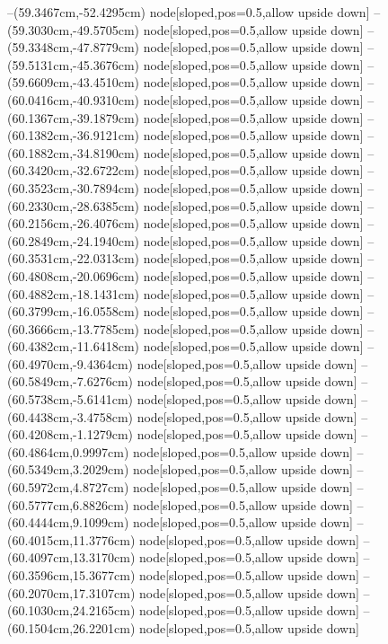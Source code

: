 --(59.3467cm,-52.4295cm) node[sloped,pos=0.5,allow upside down]{\arrowIn}
--(59.3030cm,-49.5705cm) node[sloped,pos=0.5,allow upside down]{\ArrowIn}
--(59.3348cm,-47.8779cm) node[sloped,pos=0.5,allow upside down]{\ArrowIn}
--(59.5131cm,-45.3676cm) node[sloped,pos=0.5,allow upside down]{\ArrowIn}
--(59.6609cm,-43.4510cm) node[sloped,pos=0.5,allow upside down]{\ArrowIn}
--(60.0416cm,-40.9310cm) node[sloped,pos=0.5,allow upside down]{\ArrowIn}
--(60.1367cm,-39.1879cm) node[sloped,pos=0.5,allow upside down]{\ArrowIn}
--(60.1382cm,-36.9121cm) node[sloped,pos=0.5,allow upside down]{\ArrowIn}
--(60.1882cm,-34.8190cm) node[sloped,pos=0.5,allow upside down]{\ArrowIn}
--(60.3420cm,-32.6722cm) node[sloped,pos=0.5,allow upside down]{\ArrowIn}
--(60.3523cm,-30.7894cm) node[sloped,pos=0.5,allow upside down]{\ArrowIn}
--(60.2330cm,-28.6385cm) node[sloped,pos=0.5,allow upside down]{\ArrowIn}
--(60.2156cm,-26.4076cm) node[sloped,pos=0.5,allow upside down]{\ArrowIn}
--(60.2849cm,-24.1940cm) node[sloped,pos=0.5,allow upside down]{\ArrowIn}
--(60.3531cm,-22.0313cm) node[sloped,pos=0.5,allow upside down]{\ArrowIn}
--(60.4808cm,-20.0696cm) node[sloped,pos=0.5,allow upside down]{\ArrowIn}
--(60.4882cm,-18.1431cm) node[sloped,pos=0.5,allow upside down]{\ArrowIn}
--(60.3799cm,-16.0558cm) node[sloped,pos=0.5,allow upside down]{\ArrowIn}
--(60.3666cm,-13.7785cm) node[sloped,pos=0.5,allow upside down]{\ArrowIn}
--(60.4382cm,-11.6418cm) node[sloped,pos=0.5,allow upside down]{\ArrowIn}
--(60.4970cm,-9.4364cm) node[sloped,pos=0.5,allow upside down]{\ArrowIn}
--(60.5849cm,-7.6276cm) node[sloped,pos=0.5,allow upside down]{\ArrowIn}
--(60.5738cm,-5.6141cm) node[sloped,pos=0.5,allow upside down]{\ArrowIn}
--(60.4438cm,-3.4758cm) node[sloped,pos=0.5,allow upside down]{\ArrowIn}
--(60.4208cm,-1.1279cm) node[sloped,pos=0.5,allow upside down]{\ArrowIn}
--(60.4864cm,0.9997cm) node[sloped,pos=0.5,allow upside down]{\ArrowIn}
--(60.5349cm,3.2029cm) node[sloped,pos=0.5,allow upside down]{\ArrowIn}
--(60.5972cm,4.8727cm) node[sloped,pos=0.5,allow upside down]{\ArrowIn}
--(60.5777cm,6.8826cm) node[sloped,pos=0.5,allow upside down]{\ArrowIn}
--(60.4444cm,9.1099cm) node[sloped,pos=0.5,allow upside down]{\ArrowIn}
--(60.4015cm,11.3776cm) node[sloped,pos=0.5,allow upside down]{\ArrowIn}
--(60.4097cm,13.3170cm) node[sloped,pos=0.5,allow upside down]{\ArrowIn}
--(60.3596cm,15.3677cm) node[sloped,pos=0.5,allow upside down]{\ArrowIn}
--(60.2070cm,17.3107cm) node[sloped,pos=0.5,allow upside down]{\ArrowIn}
--(60.1030cm,24.2165cm) node[sloped,pos=0.5,allow upside down]{\ArrowIn}
--(60.1504cm,26.2201cm) node[sloped,pos=0.5,allow upside down]{\ArrowIn}
